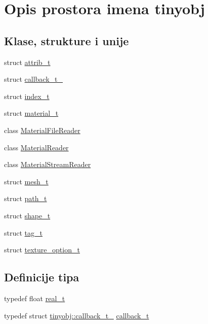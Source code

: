 \hypertarget{namespacetinyobj}{}\section{Opis prostora imena tinyobj}
\label{namespacetinyobj}
\subsection*{Klase, strukture i unije}
\begin{DoxyCompactItemize}
\item 
struct \hyperlink{structtinyobj_1_1attrib__t}{attrib\+\_\+t}
\item 
struct \hyperlink{structtinyobj_1_1callback__t__}{callback\+\_\+t\+\_\+}
\item 
struct \hyperlink{structtinyobj_1_1index__t}{index\+\_\+t}
\item 
struct \hyperlink{structtinyobj_1_1material__t}{material\+\_\+t}
\item 
class \hyperlink{classtinyobj_1_1MaterialFileReader}{Material\+File\+Reader}
\item 
class \hyperlink{classtinyobj_1_1MaterialReader}{Material\+Reader}
\item 
class \hyperlink{classtinyobj_1_1MaterialStreamReader}{Material\+Stream\+Reader}
\item 
struct \hyperlink{structtinyobj_1_1mesh__t}{mesh\+\_\+t}
\item 
struct \hyperlink{structtinyobj_1_1path__t}{path\+\_\+t}
\item 
struct \hyperlink{structtinyobj_1_1shape__t}{shape\+\_\+t}
\item 
struct \hyperlink{structtinyobj_1_1tag__t}{tag\+\_\+t}
\item 
struct \hyperlink{structtinyobj_1_1texture__option__t}{texture\+\_\+option\+\_\+t}
\end{DoxyCompactItemize}
\subsection*{Definicije tipa}
\begin{DoxyCompactItemize}
\item 
typedef float \hyperlink{namespacetinyobj_ad5ca7469ff56bf0d8423120cfd99adce}{real\+\_\+t}
\item 
typedef struct \hyperlink{structtinyobj_1_1callback__t__}{tinyobj\+::callback\+\_\+t\+\_\+} \hyperlink{namespacetinyobj_a7d9ae2b4716367a1b66b4d354482b035}{callback\+\_\+t}
\end{DoxyCompactItemize}
